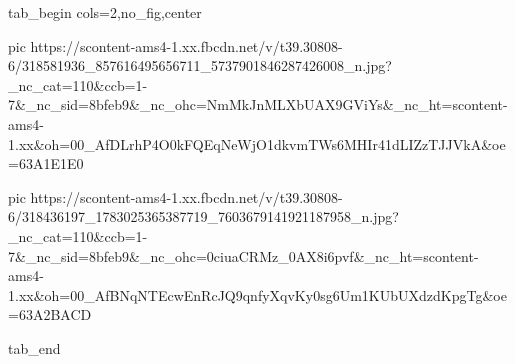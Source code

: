  
 
 
 
 


\ifcmt
  tab_begin cols=2,no_fig,center

     pic https://scontent-ams4-1.xx.fbcdn.net/v/t39.30808-6/318581936_857616495656711_5737901846287426008_n.jpg?_nc_cat=110&ccb=1-7&_nc_sid=8bfeb9&_nc_ohc=NmMkJnMLXbUAX9GViYs&_nc_ht=scontent-ams4-1.xx&oh=00_AfDLrhP4O0kFQEqNeWjO1dkvmTWs6MHIr41dLIZzTJJVkA&oe=63A1E1E0

     pic https://scontent-ams4-1.xx.fbcdn.net/v/t39.30808-6/318436197_1783025365387719_7603679141921187958_n.jpg?_nc_cat=110&ccb=1-7&_nc_sid=8bfeb9&_nc_ohc=0ciuaCRMz_0AX8i6pvf&_nc_ht=scontent-ams4-1.xx&oh=00_AfBNqNTEcwEnRcJQ9qnfyXqvKy0sg6Um1KUbUXdzdKpgTg&oe=63A2BACD

  tab_end
\fi
